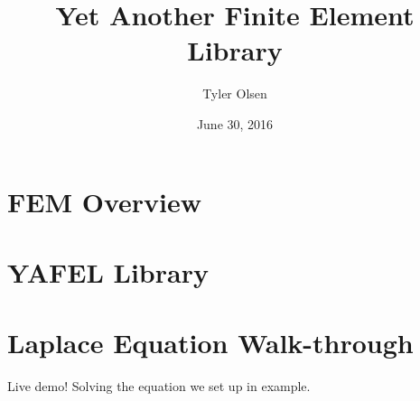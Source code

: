 \documentclass{beamer}
\title[YAFEL]{Yet Another Finite Element Library}
\author{Tyler Olsen}
\date{June 30, 2016}
\begin{document}
\begin{frame}
  \titlepage
\end{frame}

\section{FEM Overview}


\section{YAFEL Library}


\section{Laplace Equation Walk-through}
\begin{frame}
  Live demo! Solving the equation we set up in example.
\end{frame}
\end{document}
